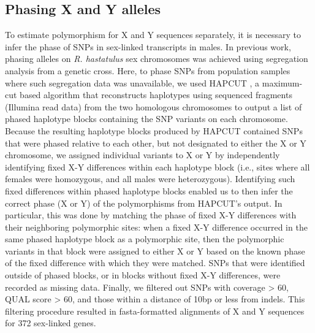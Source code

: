 \documentclass[9pt,twocolumn,twoside]{gsajnl}
\begin{document}
\subsection*{Phasing X and Y alleles}
To estimate polymorphism for X and Y sequences separately, it is necessary to infer the phase of SNPs in sex-linked transcripts in males. In previous work, phasing alleles on \textit{R. hastatulus} sex chromosomes was achieved using segregation analysis from a genetic cross. Here, to phase SNPs from population samples where such segregation data was unavailable, we used HAPCUT \citep{bansal2008hapcut}, a maximum-cut based algorithm that reconstructs haplotypes using sequenced fragments (Illumina read data) from the two homologous chromosomes to output a list of phased haplotype blocks containing the SNP variants on each chromosome. Because the resulting haplotype blocks produced by HAPCUT contained SNPs that were phased relative to each other, but not designated to either the X or Y chromosome, we assigned individual variants to X or Y by independently identifying fixed X-Y differences within each haplotype block (i.e., sites where all females were homozygous, and all males were heterozygous). Identifying such fixed differences within phased haplotype blocks enabled us to then infer the correct phase (X or Y) of the polymorphisms from HAPCUT’s output. In particular, this was done by matching the phase of fixed X-Y differences with their neighboring polymorphic sites: when a fixed X-Y difference occurred in the same phased haplotype block as a polymorphic site, then the polymorphic variants in that block were assigned to either X or Y based on the known phase of the fixed difference with which they were matched. SNPs that were identified outside of phased blocks, or in blocks without fixed X-Y differences, were recorded as missing data. Finally, we filtered out SNPs with coverage > 60, QUAL score > 60, and those within a distance of 10bp or less from indels. This filtering procedure resulted in fasta-formatted alignments of X and Y sequences for 372 sex-linked genes.
\end{document}
